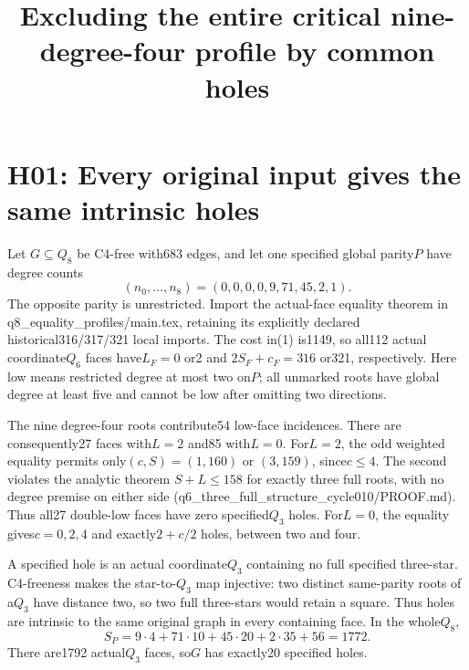 \documentclass{article}
\begin{document}
\title{Excluding the entire critical nine-degree-four profile by common holes}
\maketitle
\section{H01: Every original input gives the same intrinsic holes}
Let $G\subseteq Q_8$ be C4-free with683 edges, and let one specified
global parity$P$ have degree counts
\[
             (n_0,\ldots,n_8)=(0,0,0,0,9,71,45,2,1).       \tag{1}
\]
The opposite parity is unrestricted. Import the actual-face equality
theorem in q8\_equality\_profiles/main.tex, retaining its explicitly
declared historical316/317/321 local imports. The cost in(1) is1149,
so all112 actual coordinate$Q_6$ faces have$L_F=0$ or2 and
$2S_F+c_F=316$ or321, respectively. Here low means restricted degree
at most two on$P$; all unmarked roots have global degree at least five
and cannot be low after omitting two directions.

The nine degree-four roots contribute54 low-face incidences. There
are consequently27 faces with$L=2$ and85 with$L=0$.
For$L=2$, the odd weighted equality permits only$(c,S)=(1,160)$ or
$(3,159)$, since$c\le4$. The second violates the analytic theorem
$S+L\le158$ for exactly three full roots, with no degree premise on
either side (q6\_three\_full\_structure\_cycle010/PROOF.md).
Thus all27 double-low faces have zero specified$Q_3$ holes.
For$L=0$, the equality gives$c=0,2,4$ and exactly$2+c/2$ holes,
between two and four.

A specified hole is an actual coordinate$Q_3$ containing no full
specified three-star. C4-freeness makes the star-to-$Q_3$ map injective:
two distinct same-parity roots of a$Q_3$ have distance two, so two full
three-stars would retain a square. Thus holes are intrinsic to the
same original graph in every containing face. In the whole$Q_8$,
\[
 S_P=9\cdot4+71\cdot10+45\cdot20+2\cdot35+56=1772.
\]
There are1792 actual$Q_3$ faces, so$G$ has exactly20 specified holes.
\end{document}
